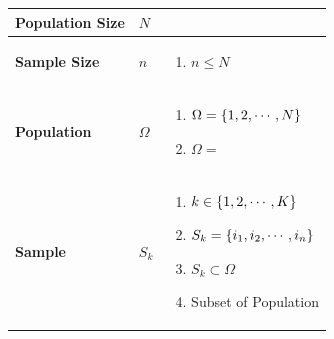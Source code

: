 \begin{customArrayStretch}{1.3}
\begin{longtable}{p{3.5cm} p{0.5cm} p{11cm}}

\hline \endfirsthead
\hline \endhead
\hline \endfoot
\hline \endlastfoot


\textbf{Population Size} &
    $N$ &
    \\ \hline

\textbf{Sample Size} &
    $n$ &
    \begin{minipage}{10cm}
        \vspace{0.15cm}
        \begin{enumerate}
            \item $n \leq N$
        \end{enumerate}
        \vspace{0.15cm}
    \end{minipage} 
    \\ \hline

\textbf{Population} &
    $\Omega$ &
    \begin{minipage}{10cm}
        \vspace{0.15cm}
        \begin{enumerate}
            \item $\Omega = \left\{1,2,\cdots,N\right\}$
            \item $\Omega = $
        \end{enumerate}
        \vspace{0.15cm}
    \end{minipage} 
    \\ \hline


\textbf{Sample} &
    $S_k$ &
    \begin{minipage}{10cm}
        \vspace{0.15cm}
        \begin{enumerate}
            \item $k \in \left\{1,2,\cdots, K\right\}$
            \item $S_k = \left\{i_1,i_2,\cdots,i_n\right\}$
            \item $S_k \subset \Omega$
            \item Subset of Population
        \end{enumerate}
        \vspace{0.15cm}
    \end{minipage} 
    \\ \hline





\end{longtable}
\end{customArrayStretch}


